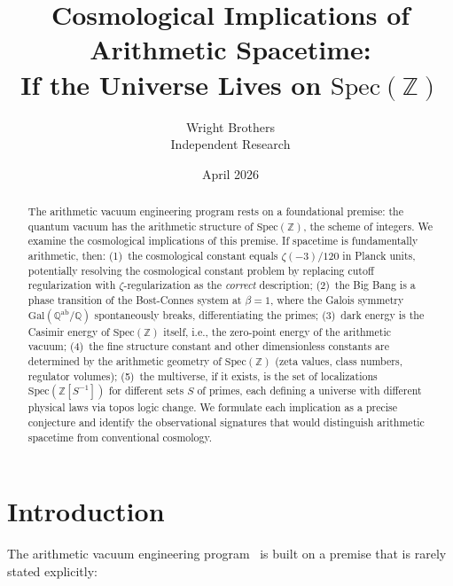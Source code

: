 \documentclass[11pt,a4paper]{article}
\newcommand{\Spec}{\mathrm{Spec}}
\begin{document}
\title{Cosmological Implications of Arithmetic Spacetime:\\
  If the Universe Lives on $\Spec(\mathbb{Z})$}

\author{Wright Brothers\\{\small Independent Research}}
\date{April 2026}
\maketitle

\begin{abstract}
The arithmetic vacuum engineering program rests on a
foundational premise: the quantum vacuum has the arithmetic
structure of $\Spec(\mathbb{Z})$, the scheme of integers.
We examine the cosmological implications of this premise.
If spacetime is fundamentally arithmetic, then:
(1)~the cosmological constant equals $\zeta(-3)/120$ in Planck
units, potentially resolving the cosmological constant problem
by replacing cutoff regularization with $\zeta$-regularization
as the \emph{correct} description;
(2)~the Big Bang is a phase transition of the Bost-Connes system
at $\beta = 1$, where the Galois symmetry
$\mathrm{Gal}(\mathbb{Q}^{\mathrm{ab}}/\mathbb{Q})$ spontaneously
breaks, differentiating the primes;
(3)~dark energy is the Casimir energy of $\Spec(\mathbb{Z})$ itself,
i.e., the zero-point energy of the arithmetic vacuum;
(4)~the fine structure constant and other dimensionless constants
are determined by the arithmetic geometry of $\Spec(\mathbb{Z})$
(zeta values, class numbers, regulator volumes);
(5)~the multiverse, if it exists, is the set of localizations
$\Spec(\mathbb{Z}[S^{-1}])$ for different sets $S$ of primes,
each defining a universe with different physical laws
via topos logic change.
We formulate each implication as a precise conjecture and
identify the observational signatures that would distinguish
arithmetic spacetime from conventional cosmology.
\end{abstract}

\section{Introduction}
\label{sec:intro}

The arithmetic vacuum engineering program~\cite{paper_A,paper_B,paper_C}
is built on a premise that is rarely stated explicitly:
\end{document}
